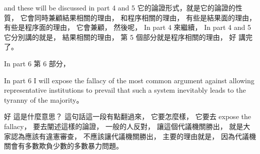 \hypertarget{w06:cue:435}{}and these will be discussed in part 4 and 5
\hypertarget{w06:cue:436}{}它的論證形式，就是它的論證的性質，
\hypertarget{w06:cue:437}{}它會同時兼顧結果相關的理由，
\hypertarget{w06:cue:438}{}和程序相關的理由，
\hypertarget{w06:cue:439}{}有些是結果面的理由，
\hypertarget{w06:cue:440}{}有些是程序面的理由，
\hypertarget{w06:cue:441}{}它會兼顧，
\hypertarget{w06:cue:442}{}然後呢，
\hypertarget{w06:cue:443}{}In part 4 來繼續，
\hypertarget{w06:cue:444}{}In part 4 and 5
\hypertarget{w06:cue:445}{}它分別講的就是，
\hypertarget{w06:cue:446}{}結果相關的理由，
\hypertarget{w06:cue:447}{}第 5 個部分就是程序相關的理由，
\hypertarget{w06:cue:448}{}好 講完了。

\hypertarget{w06:cue:449}{}In part 6 第 6 部分，

\hypertarget{w06:cue:450}{}In part 6
\hypertarget{w06:cue:451}{}I will expose the fallacy of the most common argument
\hypertarget{w06:cue:452}{}against allowing representative institutions to prevail
\hypertarget{w06:cue:453}{}that such a system inevitably leads to the tyranny of the majority。

\hypertarget{w06:cue:454}{}好 這是什麼意思？
\hypertarget{w06:cue:455}{}這句話這一段有點翻過來，
\hypertarget{w06:cue:456}{}它要怎麼樣，
\hypertarget{w06:cue:457}{}它要去 expose the fallacy，
\hypertarget{w06:cue:458}{}要去闡述這樣的論證，
\hypertarget{w06:cue:459}{}一般的人反對，
\hypertarget{w06:cue:460}{}讓這個代議機關勝出，
\hypertarget{w06:cue:461}{}就是大家認為應該有違憲審查，
\hypertarget{w06:cue:462}{}不應該讓代議機關勝出，
\hypertarget{w06:cue:463}{}主要的理由就是，
\hypertarget{w06:cue:464}{}因為代議機關會有多數欺負少數的多數暴力問題。

